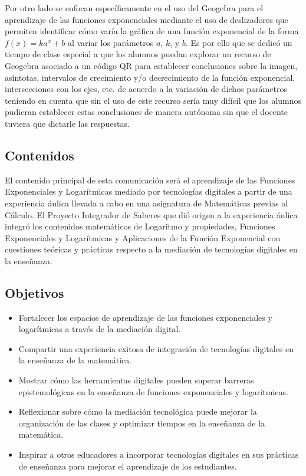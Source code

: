Por otro lado \textcite{garcia2020} se enfocan específicamente en el uso del Geogebra para el aprendizaje de las funciones exponenciales mediante el uso de deslizadores que permiten identificar cómo varía la gráfica de una función exponencial de la forma $f(x) = k a^x + b$ al variar los parámetros $a$, $k$, y $b$. Es por ello que se dedicó un tiempo de clase especial a que los alumnos puedan explorar un recurso de Geogebra asociado a un código QR para establecer conclusiones sobre la imagen, asíntotas, intervalos de crecimiento y/o decrecimiento de la función exponencial, intersecciones con los ejes, etc. de acuerdo a la variación de dichos parámetros teniendo en cuenta que sin el uso de este recurso sería muy difícil que los alumnos pudieran establecer estas conclusiones de manera autónoma sin que el docente tuviera que dictarle las respuestas.

\subsection{Contenidos}

El contenido principal de esta comunicación será el aprendizaje de las Funciones Exponenciales y Logarítmicas mediado por tecnologías digitales a partir de una experiencia áulica llevada a cabo en una asignatura de Matemáticas previas al Cálculo. El Proyecto Integrador de Saberes que dió origen a la experiencia áulica integró los contenidos matemáticos de Logaritmo y propiedades, Funciones Exponenciales y Logarítmicas y Aplicaciones de la Función Exponencial con cuestiones teóricas y prácticas respecto a la mediación de tecnologías digitales en la enseñanza.

\subsection{Objetivos}

\begin{itemize}
	\item Fortalecer los espacios de aprendizaje de las funciones exponenciales y logarítmicas a través de la mediación digital.
	\item Compartir una experiencia exitosa de integración de tecnologías digitales en la enseñanza de la matemática.
	\item Mostrar cómo las herramientas digitales pueden superar barreras epistemológicas en la enseñanza de funciones exponenciales y logarítmicas.
	\item Reflexionar sobre cómo la mediación tecnológica puede mejorar la organización de las clases y optimizar tiempos en la enseñanza de la	matemática.
	\item Inspirar a otros educadores a incorporar tecnologías digitales en sus prácticas de enseñanza para mejorar el aprendizaje de los estudiantes.
\end{itemize}

